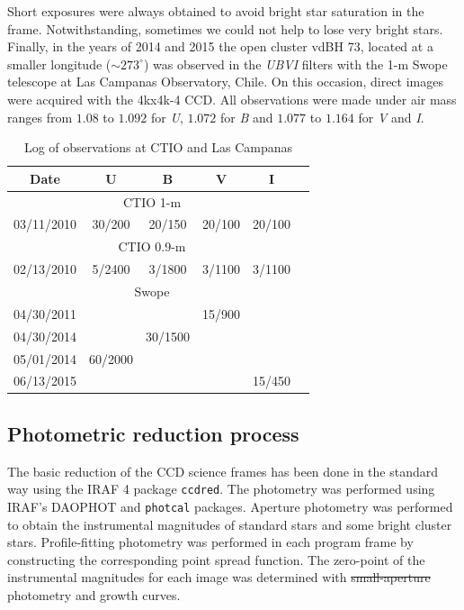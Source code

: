 \documentclass[draft]{aa}
\providecommand{\DIFaddtex}[1]{{\protect\color{blue}\uwave{#1}}} %
\providecommand{\DIFdeltex}[1]{{\protect\color{red}\sout{#1}}}                      %
\providecommand{\DIFaddbegin}{} %
\providecommand{\DIFaddend}{} %
\providecommand{\DIFdelbegin}{} %
\providecommand{\DIFdelend}{} %
\providecommand{\DIFadd}[1]{\texorpdfstring{\DIFaddtex{#1}}{#1}} %
\providecommand{\DIFdel}[1]{\texorpdfstring{\DIFdeltex{#1}}{}} %
\newcommand{\DIFscaledelfig}{0.5}
\newlength{\DIFdelgraphicswidth} %
\newlength{\DIFdelgraphicsheight} %
\newcommand{\DIFaddincludegraphics}[2][]{{\color{blue}\fbox{\DIFOincludegraphics[#1]{#2}}}} %
\newcommand{\DIFdelincludegraphics}[2][]{%
\sbox{\DIFdelgraphicsbox}{\DIFOincludegraphics[#1]{#2}}%
\settoboxwidth{\DIFdelgraphicswidth}{\DIFdelgraphicsbox} %
\settoboxtotalheight{\DIFdelgraphicsheight}{\DIFdelgraphicsbox} %
\scalebox{\DIFscaledelfig}{%
\parbox[b]{\DIFdelgraphicswidth}{\usebox{\DIFdelgraphicsbox}\\[-\baselineskip] \rule{\DIFdelgraphicswidth}{0em}}\llap{\resizebox{\DIFdelgraphicswidth}{\DIFdelgraphicsheight}{%
\setlength{\unitlength}{\DIFdelgraphicswidth}%
\begin{picture}(1,1)%
\thicklines\linethickness{2pt} %
{\color[rgb]{1,0,0}\put(0,0){\framebox(1,1){}}}%
{\color[rgb]{1,0,0}\put(0,0){\line( 1,1){1}}}%
{\color[rgb]{1,0,0}\put(0,1){\line(1,-1){1}}}%
\end{picture}%
}\hspace*{3pt}}} %
} %
\DeclareRobustCommand{\DIFaddbegin}{\DIFOaddbegin \let\includegraphics\DIFaddincludegraphics} %
\DeclareRobustCommand{\DIFaddend}{\DIFOaddend \let\includegraphics\DIFOincludegraphics} %
\DeclareRobustCommand{\DIFdelbegin}{\DIFOdelbegin \let\includegraphics\DIFdelincludegraphics} %
\DeclareRobustCommand{\DIFdelend}{\DIFOaddend \let\includegraphics\DIFOincludegraphics} %
\begin{document}
Short exposures were always obtained to avoid bright star saturation in the
frame. Notwithstanding, sometimes we could not help to lose very bright stars.
Finally, in the years of 2014 and 2015 the open cluster vdBH 73,
located at a smaller longitude ($\sim 273^\circ$) was observed in the 
\textit{UBVI} filters with the 1-m Swope telescope at Las Campanas Observatory,
Chile. On this occasion, direct images were acquired with the 4kx4k-4 CCD. All
observations were made under air mass ranges from $1.08$ to $1.092$ for 
\textit{U}, $1.072$ for \textit{B} and $1.077$ to $1.164$ for \textit{V} and 
\textit{I}.

\begin{table}[ht]
    \centering
    \begin{tabular}{cccccc}
    \hline
         Date & U & B & V & I  \\
         \hline \hline
         \multicolumn{5}{c}{CTIO 1-m}\\
         \hline
         03/11/2010 & 30/200 & 20/150 & 20/100 & 20/100\\
         \multicolumn{5}{c}{CTIO 0.9-m}\\
         \hline
         02/13/2010 & 5/2400 & 3/1800 & 3/1100 & 3/1100\\
         \multicolumn{5}{c}{Swope}\\
         \hline
         04/30/2011 & & & 15/900 & \\
         04/30/2014 & & 30/1500 & & \\
         05/01/2014 & 60/2000 & & & \\
         06/13/2015 & & & & 15/450 \\
         \hline
    \end{tabular}
    \caption{Log of observations at CTIO and Las Campanas}
    \label{tab:log_ctio}
\end{table}




\subsection{Photometric reduction process}

The basic reduction of the CCD science frames has been done in the standard way
using the IRAF 4 package \texttt{ccdred}. The photometry was performed using
IRAF's DAOPHOT \citep{Stetson_1987,Stetson_1990} and \texttt{photcal} packages.
Aperture photometry was performed to obtain the instrumental magnitudes of
standard stars and some bright cluster stars. Profile-fitting photometry was
performed in each program frame by constructing the corresponding point spread
function. The zero-point of the instrumental magnitudes for each image was
determined with \DIFdelbegin \DIFdel{small-aperture }\DIFdelend \DIFaddbegin \DIFadd{aperture }\DIFaddend photometry and growth curves.
\end{document}
